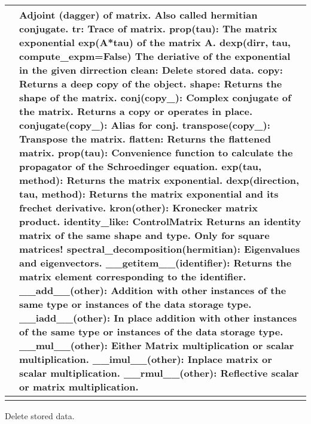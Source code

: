 \documentclass[letterpaper,10pt,english]{sphinxmanual}
\begin{document}
\begin{fulllineitems}
\begin{savenotes}
\begin{tabulary}{\linewidth}[t]{|T|T|}
&
Adjoint (dagger) of matrix. Also called hermitian conjugate.  tr: Trace of matrix.  prop(tau): The matrix exponential exp(A*tau) of the matrix A.  dexp(dirr, tau, compute\_expm=False) The deriative of the exponential in the given dirrection  clean: Delete stored data.  copy: Returns a deep copy of the object.  shape: Returns the shape of the matrix.  conj({\color{red}\bfseries{}copy\_}): Complex conjugate of the matrix. Returns a copy or operates in place.  conjugate({\color{red}\bfseries{}copy\_}): Alias for conj.  transpose({\color{red}\bfseries{}copy\_}): Transpose the matrix.  flatten: Returns the flattened matrix.  prop(tau): Convenience function to calculate the propagator of the Schroedinger equation.  exp(tau, method): Returns the matrix exponential.  dexp(direction, tau, method): Returns the matrix exponential and its frechet derivative.  kron(other): Kronecker matrix product.  identity\_like: ControlMatrix Returns an identity matrix of the same shape and type. Only for square matrices!  spectral\_decomposition(hermitian): Eigenvalues and eigenvectors.  \_\_getitem\_\_(identifier): Returns the matrix element corresponding to the identifier.  \_\_add\_\_(other): Addition with other instances of the same type or instances of the data storage type.  \_\_iadd\_\_(other): In place addition with other instances of the same type or instances of the data storage type.  \_\_mul\_\_(other): Either Matrix multiplication or scalar multiplication.  \_\_imul\_\_(other): Inplace matrix or scalar multiplication.  \_\_rmul\_\_(other): Reflective scalar or matrix multiplication.
\\
\hline
{}
&\\
\hline
\end{tabulary}
\par
\sphinxattableend\end{savenotes}

\begin{fulllineitems}
\label{\detokenize{qsim:qsim.matrix.OperatorMatrix.clean}}
Delete stored data.

\end{fulllineitems}



\end{fulllineitems}
\end{document}
